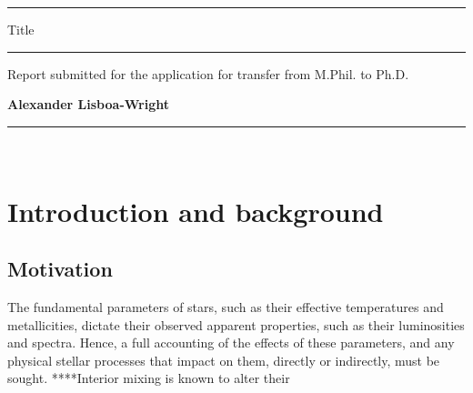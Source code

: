 \documentclass[12pt, a4paper]{report}
\begin{document}
\begin{titlepage}

\vspace*{-0.4cm}

\begin{center}
\hrule
\vspace*{0.5cm}
{\Huge \sc Title \par}
\vspace*{0.5cm}
\hrule

\vspace*{5mm}
{\normalsize Report submitted for the application for transfer from M.Phil. to Ph.D.}

\vfill

{\bf Alexander Lisboa-Wright}

\end{center}

\vspace*{1.0cm}

\hrule
\vspace*{0.2cm}
\\

\end{titlepage}

\begin{abstract}
The abstract of the paper.
\end{abstract}

\chapter{Introduction and background}
\section{Motivation}
The fundamental parameters of stars, such as their effective temperatures and metallicities, dictate their observed apparent properties, such as their luminosities and spectra. Hence, a full accounting of the effects of these parameters, and any physical stellar processes that impact on them, directly or indirectly, must be sought. ****Interior mixing is known to alter their 
\end{document}

